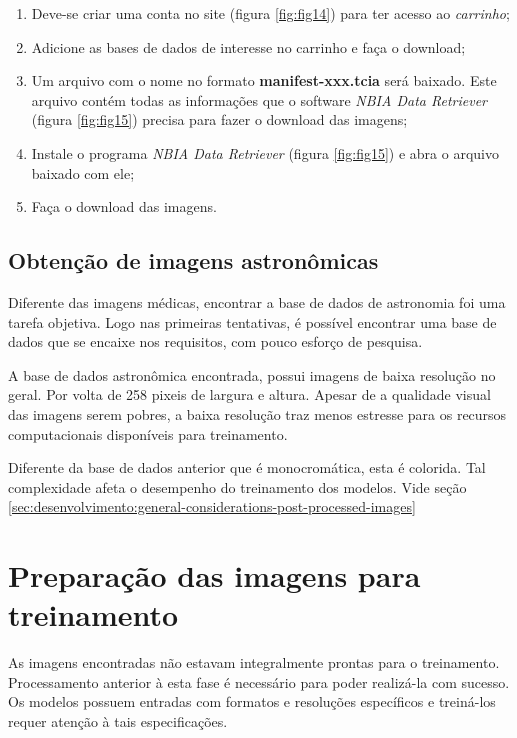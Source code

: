 \begin{enumerate}
    \item Deve-se criar uma conta no site \cite{cancer_imaging_archive_cancer_2022} (figura \ref{fig:fig14}) para ter acesso ao \textit{carrinho};

    \item Adicione as bases de dados de interesse no carrinho e faça o download;

    \item Um arquivo com o nome no formato \textbf{manifest-xxx.tcia} será baixado. Este arquivo contém todas as informações que o software \textit{NBIA Data Retriever} (figura \ref{fig:fig15}) precisa para fazer o download das imagens;

    \item Instale o programa \textit{NBIA Data Retriever} (figura \ref{fig:fig15}) e abra o arquivo baixado com ele;

    \item Faça o download das imagens.
\end{enumerate}

\subsection{Obtenção de imagens astronômicas}
\label{sec:imagens_astronomicas}

Diferente das imagens médicas, encontrar a base de dados de astronomia foi uma tarefa objetiva. Logo nas primeiras tentativas, é possível encontrar uma base de dados que se encaixe nos requisitos, com pouco esforço de pesquisa.

A base de dados astronômica encontrada, possui imagens de baixa resolução no geral. Por volta de 258 pixeis de largura e altura. Apesar de a qualidade visual das imagens serem pobres, a baixa resolução traz menos estresse para os recursos computacionais disponíveis para treinamento.

Diferente da base de dados anterior que é monocromática, esta é colorida. Tal complexidade afeta o desempenho do treinamento dos modelos. Vide seção \ref{sec:desenvolvimento:general-considerations-post-processed-images}

\section{Preparação das imagens para treinamento}
\label{sec:prep-imgs}

As imagens encontradas não estavam integralmente prontas para o treinamento. Processamento anterior à esta fase é necessário para poder realizá-la com sucesso. Os modelos possuem entradas com formatos e resoluções específicos e treiná-los requer atenção à tais especificações.

